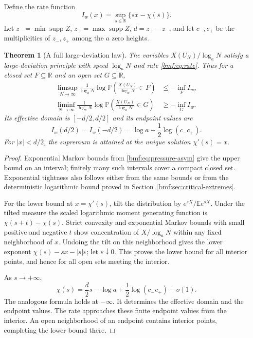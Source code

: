 \documentclass[11pt]{article}
\numberwithin{equation}{section}
\newtheorem{theorem}{Theorem}[section]
\theoremstyle{definition}
\theoremstyle{remark}
\newcommand{\R}{\mathbb{R}}
\newcommand{\E}{\mathbb E}
\newcommand{\Prob}{\mathbb P}
\newcommand{\supp}{\operatorname{supp}}
\begin{document}
Define the rate function
\begin{equation}\label{bmf:eq:rate}
 I_w(x)=\sup_{s\in\R}\{sx-\chi(s)\}.
\end{equation}
Let $z_-=\min\supp Z$, $z_+=\max\supp Z$,
$d=z_+-z_-$, and let $c_-,c_+$ be the multiplicities of
$z_-,z_+$ among the $a$ zero heights.

\begin{theorem}[A full large-deviation law]\label{bmf:thm:ldp}
The variables $X(U_N)/\log_a N$ satisfy a large-deviation principle
with speed $\log_a N$ and rate \eqref{bmf:eq:rate}. Thus for a closed
set $F\subseteq\R$ and an open set $G\subseteq\R$,
\begin{align}
 \limsup_{N\to\infty}\frac1{\log_a N}
  \log\Prob\!\left(\frac{X(U_N)}{\log_a N}\in F\right)
 &\leq-\inf_F I_w,\label{bmf:eq:ldp-upper}\\
 \liminf_{N\to\infty}\frac1{\log_a N}
  \log\Prob\!\left(\frac{X(U_N)}{\log_a N}\in G\right)
 &\geq-\inf_G I_w.\label{bmf:eq:ldp-lower}
\end{align}
Its effective domain is $[-d/2,d/2]$ and its endpoint values are
\begin{equation}\label{bmf:eq:rate-endpoint}
 I_w(d/2)=I_w(-d/2)
 =\log a-\frac12\log(c_-c_+).
\end{equation}
For $|x|<d/2$, the supremum is attained at the unique solution
$\chi'(s)=x$.
\end{theorem}
\begin{proof}
Exponential Markov bounds from \eqref{bmf:eq:pressure-asym} give the
upper bound on an interval; finitely many such intervals cover
a compact closed set. Exponential tightness also follows either
from the same bounds or from the deterministic logarithmic bound
proved in Section~\ref{bmf:sec:critical-extremes}.

For the lower bound at $x=\chi'(s)$, tilt the distribution by
$e^{sX}/\E e^{sX}$. Under the tilted measure the scaled
logarithmic moment generating function is
$\chi(s+t)-\chi(s)$. Strict convexity and exponential Markov
bounds with small positive and negative $t$ show concentration
of $X/\log_a N$ within any fixed neighborhood of $x$.
Undoing the tilt on this neighborhood gives the lower exponent
$\chi(s)-sx-|s|\varepsilon$; let $\varepsilon\downarrow0$.
This proves the lower bound for all interior points, and hence
for all open sets meeting the interior.

As $s\to+\infty$,
\[
 \chi(s)=\frac d2s-\log a+\frac12\log(c_-c_+)+o(1).
\]
The analogous formula holds at $-\infty$. It determines the
effective domain and the endpoint values. The rate approaches
these finite endpoint values from the interior. An open
neighborhood of an endpoint contains interior points, completing
the lower bound there.
\end{proof}
\end{document}
